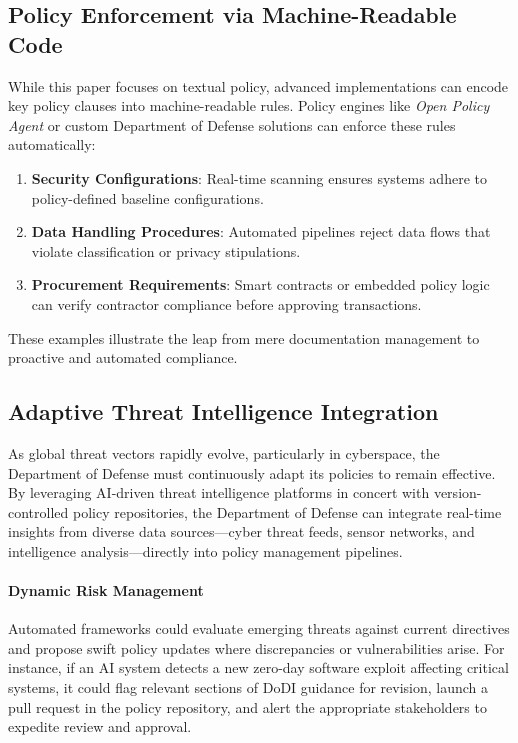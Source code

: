 \documentclass[11pt]{article}
\begin{document}
	\subsection{Policy Enforcement via Machine-Readable Code}
	While this paper focuses on textual policy, advanced implementations can encode key policy clauses into machine-readable rules. Policy engines like \textit{Open Policy Agent} or custom Department of Defense solutions can enforce these rules automatically:
	\begin{enumerate}
		\item \textbf{Security Configurations}: Real-time scanning ensures systems adhere to policy-defined baseline configurations.
		\item \textbf{Data Handling Procedures}: Automated pipelines reject data flows that violate classification or privacy stipulations.
		\item \textbf{Procurement Requirements}: Smart contracts or embedded policy logic can verify contractor compliance before approving transactions.
	\end{enumerate}
	These examples illustrate the leap from mere documentation management to proactive and automated compliance.

	\subsection{Adaptive Threat Intelligence Integration}
	As global threat vectors rapidly evolve, particularly in cyberspace, the Department of Defense must continuously adapt its policies to remain effective. By leveraging AI-driven threat intelligence platforms in concert with version-controlled policy repositories, the Department of Defense can integrate real-time insights from diverse data sources---cyber threat feeds, sensor networks, and intelligence analysis---directly into policy management pipelines.

	\paragraph{Dynamic Risk Management}
	Automated frameworks could evaluate emerging threats against current directives and propose swift policy updates where discrepancies or vulnerabilities arise. For instance, if an AI system detects a new zero-day software exploit affecting critical systems, it could flag relevant sections of DoDI guidance for revision, launch a pull request in the policy repository, and alert the appropriate stakeholders to expedite review and approval.
\end{document}
